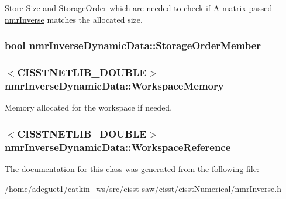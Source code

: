 Store Size and Storage\-Order which are needed to check if A matrix passed \hyperlink{nmr_inverse_8h_a018d876444a46377abdd85e296643035}{nmr\-Inverse} matches the allocated size. \hypertarget{classnmr_inverse_dynamic_data_a295f57a6eaeca3374aa4e58e983ccefd}{
\subsubsection[{Storage\-Order\-Member}]{\setlength{\rightskip}{0pt plus 5cm}bool nmr\-Inverse\-Dynamic\-Data\-::\-Storage\-Order\-Member\hspace{0.3cm}{\ttfamily [protected]}}}\label{classnmr_inverse_dynamic_data_a295f57a6eaeca3374aa4e58e983ccefd}
\hypertarget{classnmr_inverse_dynamic_data_ae76c0f077fd60cafab907d5f0e20a490}{
\subsubsection[{Workspace\-Memory}]{$<$C\-I\-S\-S\-T\-N\-E\-T\-L\-I\-B\-\_\-\-D\-O\-U\-B\-L\-E$>$ nmr\-Inverse\-Dynamic\-Data\-::\-Workspace\-Memory\hspace{0.3cm}{\ttfamily [protected]}}}\label{classnmr_inverse_dynamic_data_ae76c0f077fd60cafab907d5f0e20a490}
Memory allocated for the workspace if needed. \hypertarget{classnmr_inverse_dynamic_data_a5233a5419f7da87a54abd486832b0817}{
\subsubsection[{Workspace\-Reference}]{$<$C\-I\-S\-S\-T\-N\-E\-T\-L\-I\-B\-\_\-\-D\-O\-U\-B\-L\-E$>$ nmr\-Inverse\-Dynamic\-Data\-::\-Workspace\-Reference\hspace{0.3cm}{\ttfamily [protected]}}}\label{classnmr_inverse_dynamic_data_a5233a5419f7da87a54abd486832b0817}


The documentation for this class was generated from the following file\-:\begin{DoxyCompactItemize}
\item 
/home/adeguet1/catkin\-\_\-ws/src/cisst-\/saw/cisst/cisst\-Numerical/\hyperlink{nmr_inverse_8h}{nmr\-Inverse.\-h}\end{DoxyCompactItemize}
